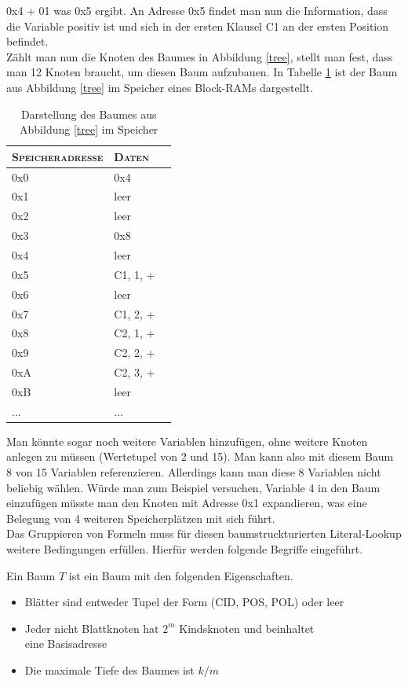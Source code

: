 0x4 + 01 was 0x5 ergibt. An Adresse 0x5 findet man nun die Information, dass die Variable positiv ist und 
sich in der ersten Klausel C1 an der ersten Position befindet.\\
Zählt man nun die Knoten des Baumes in Abbildung \ref{tree}, stellt man fest, dass man 12 Knoten 
braucht, um diesen Baum aufzubauen. In Tabelle \ref{tree_table} ist der
Baum aus Abbildung \ref{tree} im Speicher eines Block-RAMs dargestellt.
\begin{table}[h]
  \centering
  \begin{tabular}{|l|l|l|}
    \hline
    \textsc{Speicheradresse} & \textsc{Daten}\\
    \hline
    0x0 & 0x4\\
    \hline
    0x1 & leer\\
    \hline
    0x2 & leer\\
    \hline
    0x3 & 0x8\\
    \hline
    0x4 & leer\\
    \hline
    0x5 & C1, 1, +\\
    \hline
    0x6 & leer\\
    \hline
    0x7 & C1, 2, +\\
    \hline
    0x8 & C2, 1, +\\
    \hline
    0x9 & C2, 2, +\\
    \hline
    0xA & C2, 3, +\\
    \hline
    0xB & leer\\
    \hline
    ... & ...\\
    \hline
  \end{tabular}
  \caption{Darstellung des Baumes aus Abbildung \ref{tree} im Speicher}
  \label{tree_table}
\end{table}
Man könnte sogar noch weitere Variablen 
hinzufügen, ohne weitere Knoten anlegen zu müssen (Wertetupel von 2 und 15).
Man kann also mit diesem Baum 8 von 15 Variablen referenzieren.
Allerdings kann man diese 8 Variablen nicht beliebig wählen.
Würde man zum Beispiel versuchen, Variable 4 in den Baum einzufügen müsste man 
den Knoten mit Adresse 0x1 expandieren, was eine Belegung von 4 weiteren 
Speicherplätzen mit sich führt.\\
Das Gruppieren von Formeln muss für diesen baumstruckturierten Literal-Lookup
weitere Bedingungen erfüllen. Hierfür werden folgende Begriffe eingeführt.

\begin{definition}
  Ein Baum $T$ ist ein Baum mit den folgenden Eigenschaften.
  \begin{itemize}
    \item Blätter sind entweder Tupel der Form (CID, POS, POL) oder leer
    \item Jeder nicht Blattknoten hat $2^m$ Kindsknoten und beinhaltet\\
      eine Basisadresse
    \item Die maximale Tiefe des Baumes ist $k/m$
  \end{itemize}
\end{definition}

